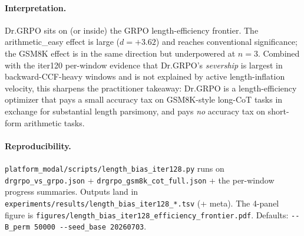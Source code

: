 \paragraph{Interpretation.}
Dr.GRPO sits on (or inside) the GRPO length-efficiency frontier.
The arithmetic\_easy effect is large ($d = +3.62$) and reaches
conventional significance; the GSM8K effect is in the same
direction but underpowered at $n{=}3$.  Combined with the iter120
per-window evidence that Dr.GRPO's \emph{severship} is largest in
backward-CCF-heavy windows and is not explained by active
length-inflation velocity, this sharpens the practitioner takeaway:
Dr.GRPO is a length-efficiency
optimizer that pays a small accuracy tax on GSM8K-style long-CoT
tasks in exchange for substantial length parsimony, and pays
\emph{no} accuracy tax on short-form arithmetic tasks.

\paragraph{Reproducibility.}
\verb|platform_modal/scripts/length_bias_iter128.py| runs on
\verb|drgrpo_vs_grpo.json| + \verb|drgrpo_gsm8k_cot_full.json| +
the per-window progress summaries.
Outputs land in
\verb|experiments/results/length_bias_iter128_*.tsv| (+ meta).
The 4-panel figure is \verb|figures/length_bias_iter128_efficiency_frontier.pdf|.
Defaults: \verb|--B_perm 50000 --seed_base 20260703|.

